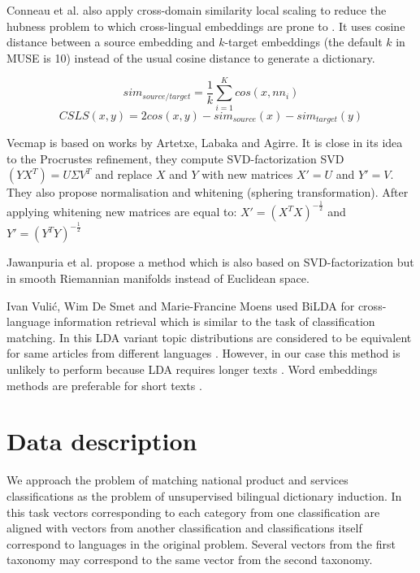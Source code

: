 \documentclass[11pt,a4paper]{article}
\begin{document}
Conneau et al. also apply cross-domain similarity local scaling to reduce the hubness problem to which cross-lingual embeddings are prone to \cite{dinu}. It uses cosine distance between a source embedding and $k$-target embeddings (the default $k$ in MUSE is 10) instead of the usual cosine distance to generate a dictionary.

$$sim_{source/target} = \dfrac{1}{k}\sum_{i=1}^Kcos(x, nn_i)$$
$$CSLS(x,y) = 2cos(x,y) - sim_{source}(x)  - sim_{target}(y)$$

Vecmap is based on works by Artetxe, Labaka and Agirre. It is close in its idea to the Procrustes refinement, they compute SVD-factorization SVD$(YX^T) = U\Sigma V^T$ and replace $X$ and $Y$ with new matrices $X' = U$ and $Y' = V$. They also propose normalisation and whitening (sphering transformation). After applying whitening new matrices are equal to:
$X' = (X^TX)^{-\tfrac{1}{2}}$ and $Y' = (Y^TY)^{-\tfrac{1}{2}}$

Jawanpuria et al. \cite{jawanpuria} propose a method which is also based on SVD-factorization but in smooth Riemannian manifolds instead of Euclidean space.

Ivan Vulić, Wim De Smet and Marie-Francine Moens  used BiLDA for cross-language information retrieval which is similar to the task of classification matching. In this LDA variant topic distributions are considered to be equivalent for same articles from different languages \cite{bilda}. However, in our case this method is unlikely to perform because LDA requires longer texts \cite{short-lda}. Word embeddings methods are preferable for short texts \cite{maslova-potapov}.

\section{Data description}
We approach the problem of matching national product and services classifications as the problem of unsupervised bilingual dictionary induction. In this task vectors corresponding to each category from one classification are aligned with vectors from another classification and classifications itself correspond to languages in the original problem. Several vectors from the first taxonomy may correspond to the same vector from the second taxonomy.
\end{document}
